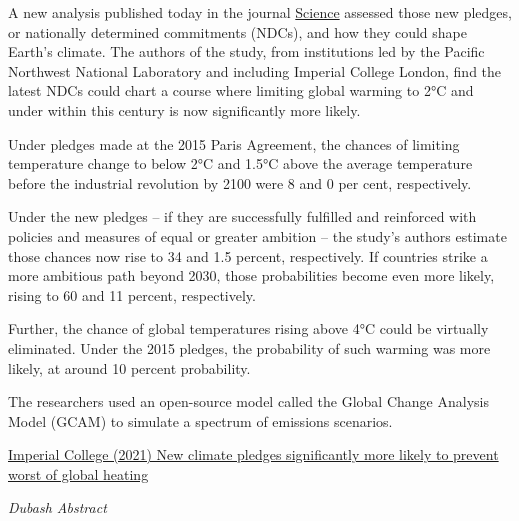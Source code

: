 \documentclass[
]{book}
\begin{document}
A new analysis published today in the journal \href{https://www.science.org/doi/10.1126/science.abm1157}{Science} assessed those new pledges, or nationally determined commitments (NDCs), and how they could shape Earth's climate. The authors of the study, from institutions led by the Pacific Northwest National Laboratory and including Imperial College London, find the latest NDCs could chart a course where limiting global warming to 2°C and under within this century is now significantly more likely.

Under pledges made at the 2015 Paris Agreement, the chances of limiting temperature change to below 2°C and 1.5°C above the average temperature before the industrial revolution by 2100 were 8 and 0 per cent, respectively.

Under the new pledges -- if they are successfully fulfilled and reinforced with policies and measures of equal or greater ambition -- the study's authors estimate those chances now rise to 34 and 1.5 percent, respectively. If countries strike a more ambitious path beyond 2030, those probabilities become even more likely, rising to 60 and 11 percent, respectively.

Further, the chance of global temperatures rising above 4°C could be virtually eliminated. Under the 2015 pledges, the probability of such warming was more likely, at around 10 percent probability.

The researchers used an open-source model called the Global Change Analysis Model (GCAM) to simulate a spectrum of emissions scenarios.

\href{https://www.imperial.ac.uk/news/231739/new-climate-pledges-significantly-more-likely/}{Imperial College (2021) New climate pledges significantly more likely to prevent worst of global heating}

\emph{Dubash Abstract}
\end{document}
